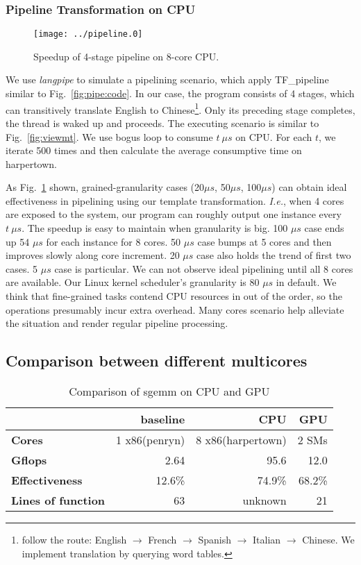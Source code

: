 \subsubsection{Pipeline Transformation on CPU}\label{exp:4}
\begin{figure}[htp]
\texttt{[image: ../pipeline.0]}
\caption{Speedup of 4-stage pipeline on 8-core CPU.}\label{fig:pipe}
\end{figure}

We use \textit{langpipe} to simulate a pipelining scenario, which apply TF\_pipeline similar to Fig.~\ref{fig:pipe:code}. In our case, the program consists of 4 stages,
which can transitively translate English to Chinese\footnote{follow the 
  route: English  $\to$ French $\to$ Spanish $\to$ Italian $\to$
  Chinese. We implement translation by querying word tables.}. Only its preceding stage completes,  the thread is waked
up and proceeds. The executing scenario is similar to Fig.~\ref{fig:viewmt}. We use bogus loop to consume $t \  \mu s$ on CPU. For each $t$, we iterate 500
times and then calculate the average consumptive time on harpertown. 

As Fig.~\ref{fig:pipe} shown, grained-granularity cases (20$\mu s$,
50$\mu s$, 100$\mu s$) can obtain ideal
effectiveness in pipelining using our template transformation.  
\textit{I.e.},  when 4 cores are exposed to the system, our program can roughly output one instance every $t\  \mu
s$. The speedup is easy to maintain when granularity is big. 100 $\mu s$ case ends up 54 $\mu s$ for each instance for 8 cores. 50  $\mu s$ case
bumps at 5 cores and then improves slowly along core increment. 20
$\mu s$ case also holds the trend of first two cases. 5 $\mu s$ case is
particular. We can not observe ideal pipelining until all 8
cores are available.  Our Linux kernel scheduler's granularity is 80
$\mu s$ in default. We think that fine-grained tasks contend
CPU resources in out of the order, so the operations presumably
incur extra overhead. Many cores scenario help alleviate the
situation and render regular pipeline processing.

\subsection{Comparison between different multicores}\label{exp:3}
\begin{table}[hbt]
\caption{Comparison of sgemm on CPU and GPU}\label{tbl:sgemm}
\begin{tabular}{|l|r|r|r|}
\hline
& baseline& CPU & GPU\\
\hline
\textbf{Cores} &1 x86(penryn)& 8 x86(harpertown)& 2 SMs\\
\hline
\textbf{Gflops}& 2.64 &95.6&  12.0\\
\hline
\textbf{Effectiveness}&12.6\%& 74.9\%&68.2\%\\
\hline
\textbf{Lines of function}&63&unknown&21\\
\hline
\end{tabular}
\end{table}

